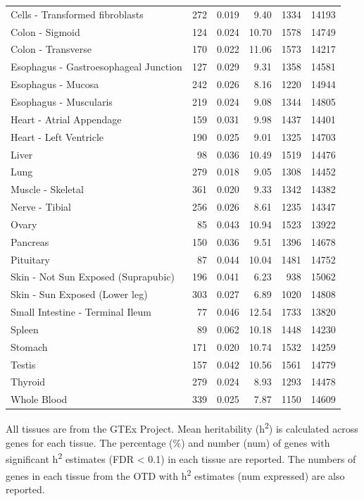 \documentclass[10pt,letterpaper]{article}
\begin{document}
\begin{table}[!ht]
\begin{adjustwidth}{-2.25in}{0in}
\begin{tabular}{lrrrrr}
   Cells - Transformed fibroblasts & 272 & 0.019 & 9.40 & 1334 & 14193 \\ 
   Colon - Sigmoid & 124 & 0.024 & 10.70 & 1578 & 14749 \\ 
   Colon - Transverse & 170 & 0.022 & 11.06 & 1573 & 14217 \\ 
   Esophagus - Gastroesophageal Junction & 127 & 0.029 & 9.31 & 1358 & 14581 \\ 
   Esophagus - Mucosa & 242 & 0.026 & 8.16 & 1220 & 14944 \\ 
   Esophagus - Muscularis & 219 & 0.024 & 9.08 & 1344 & 14805 \\ 
   Heart - Atrial Appendage & 159 & 0.031 & 9.98 & 1437 & 14401 \\ 
   Heart - Left Ventricle & 190 & 0.025 & 9.01 & 1325 & 14703 \\ 
   Liver & 98 & 0.036 & 10.49 & 1519 & 14476 \\ 
   Lung & 279 & 0.018 & 9.05 & 1308 & 14452 \\ 
   Muscle - Skeletal & 361 & 0.020 & 9.33 & 1342 & 14382 \\ 
   Nerve - Tibial & 256 & 0.026 & 8.61 & 1235 & 14347 \\ 
   Ovary & 85 & 0.043 & 10.94 & 1523 & 13922 \\ 
   Pancreas & 150 & 0.036 & 9.51 & 1396 & 14678 \\ 
   Pituitary & 87 & 0.044 & 10.04 & 1481 & 14752 \\ 
   Skin - Not Sun Exposed (Suprapubic) & 196 & 0.041 & 6.23 & 938 & 15062 \\ 
   Skin - Sun Exposed (Lower leg) & 303 & 0.027 & 6.89 & 1020 & 14808 \\ 
   Small Intestine - Terminal Ileum & 77 & 0.046 & 12.54 & 1733 & 13820 \\ 
   Spleen & 89 & 0.062 & 10.18 & 1448 & 14230 \\ 
   Stomach & 171 & 0.020 & 10.74 & 1532 & 14259 \\ 
   Testis & 157 & 0.042 & 10.56 & 1561 & 14779 \\ 
   Thyroid & 279 & 0.024 & 8.93 & 1293 & 14478 \\ 
   Whole Blood & 339 & 0.025 & 7.87 & 1150 & 14609 \\ 
   \hline
\end{tabular}
\begin{flushleft} All tissues are from the GTEx Project. Mean heritability (h\textsuperscript{2}) is calculated across genes for each tissue. The percentage (\%) and number (num) of genes with significant h\textsuperscript{2} estimates (FDR \textless{} 0.1) in each tissue are reported. The numbers of genes in each tissue from the OTD with h\textsuperscript{2} estimates (num expressed) are also reported.\end{flushleft}
\end{adjustwidth}
\end{table}
\end{document}
